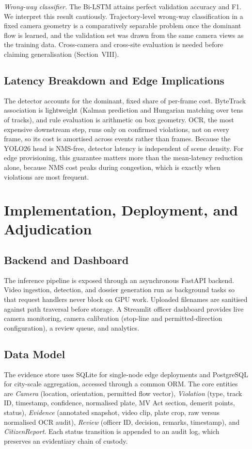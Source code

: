 \documentclass[conference]{IEEEtran}
\begin{document}
\textit{Wrong-way classifier.} The Bi-LSTM attains perfect validation accuracy and F1. We interpret this result cautiously. Trajectory-level wrong-way classification in a fixed camera geometry is a comparatively separable problem once the dominant flow is learned, and the validation set was drawn from the same camera views as the training data. Cross-camera and cross-site evaluation is needed before claiming generalisation (Section~VIII).

\subsection{Latency Breakdown and Edge Implications}
The detector accounts for the dominant, fixed share of per-frame cost. ByteTrack association is lightweight (Kalman prediction and Hungarian matching over tens of tracks), and rule evaluation is arithmetic on box geometry. OCR, the most expensive downstream step, runs only on confirmed violations, not on every frame, so its cost is amortised across events rather than frames. Because the YOLO26 head is NMS-free, detector latency is independent of scene density. For edge provisioning, this guarantee matters more than the mean-latency reduction alone, because NMS cost peaks during congestion, which is exactly when violations are most frequent.

\section{Implementation, Deployment, and Adjudication}

\subsection{Backend and Dashboard}
The inference pipeline is exposed through an asynchronous FastAPI backend. Video ingestion, detection, and dossier generation run as background tasks so that request handlers never block on GPU work. Uploaded filenames are sanitised against path traversal before storage. A Streamlit officer dashboard provides live camera monitoring, camera calibration (stop-line and permitted-direction configuration), a review queue, and analytics.

\subsection{Data Model}
The evidence store uses SQLite for single-node edge deployments and PostgreSQL for city-scale aggregation, accessed through a common ORM. The core entities are \emph{Camera} (location, orientation, permitted flow vector), \emph{Violation} (type, track ID, timestamp, confidence, normalised plate, MV Act section, demerit points, status), \emph{Evidence} (annotated snapshot, video clip, plate crop, raw versus normalised OCR audit), \emph{Review} (officer ID, decision, remarks, timestamp), and \emph{CitizenReport}. Each status transition is appended to an audit log, which preserves an evidentiary chain of custody.
\end{document}
